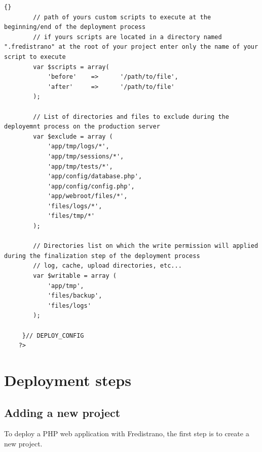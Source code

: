 \documentclass[12pt,a4paper]{report}
\begin{document}
\begin{itemize}
\begin{lstlisting}[frame=tb]{}
	 	// path of yours custom scripts to execute at the beginning/end of the deployment process
		// if yours scripts are located in a directory named ".fredistrano" at the root of your project enter only the name of your script to execute
	 	var $scripts = array(
	 		'before' 	=>		'/path/to/file', 
	 		'after' 	=>		'/path/to/file' 
	 	);

		// List of directories and files to exclude during the deployemnt process on the production server
		var $exclude = array (
			'app/tmp/logs/*',
			'app/tmp/sessions/*',
			'app/tmp/tests/*',
			'app/config/database.php',
			'app/config/config.php',
			'app/webroot/files/*',
			'files/logs/*',
			'files/tmp/*'
		);

		// Directories list on which the write permission will applied during the finalization step of the deployment process	
		// log, cache, upload directories, etc...
		var $writable = array (
			'app/tmp',
			'files/backup',
			'files/logs'
		);

	 }// DEPLOY_CONFIG
	?>
\end{lstlisting}

\end{itemize}
\newpage

\section{Deployment steps}

\subsection{Adding a new project}

To deploy a PHP web application with Fredistrano, the first step is to create a new project.\\
\end{document}
